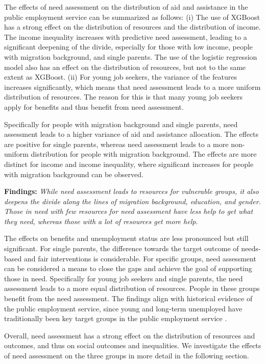 \documentclass{article} %
\begin{document}
The effects of need assessment on the distribution of aid and assistance in the public employment service can be summarized as follows: (i) The use of XGBoost has a strong effect on the distribution of resources and the distribution of income. The income inequality increases with predictive need assessment, leading to a significant deepening of the divide, especially for those with low income, people with migration background, and single parents. The use of the logistic regression model also has an effect on the distribution of resources, but not to the same extent as XGBoost. (ii) For young job seekers, the variance of the features increases significantly, which means that need assessment leads to a more uniform distribution of resources. The reason for this is that many young job seekers apply for benefits and thus benefit from need assessment.

Specifically for people with migration background and single parents, need assessment leads to a higher variance of aid and assistance allocation. The effects are positive for single parents, whereas need assessment leads to a more non-uniform distribution for people with migration background. The effects are more distinct for income and income inequality, where significant increases for people with migration background can be observed.

\textbf{Findings:} \emph{While need assessment leads to resources for vulnerable groups, it also deepens the divide along the lines of migration background, education, and gender. Those in need with few resources for need assessment have less help to get what they need, whereas those with a lot of resources get more help.}

The effects on benefits and unemployment status are less pronounced but still significant. For single parents, the difference towards the target outcome of needs-based and fair interventions is considerable. For specific groups, need assessment can be considered a means to close the gaps and achieve the goal of supporting those in need. Specifically for young job seekers and single parents, the need assessment leads to a more equal distribution of resources. People in these groups benefit from the need assessment. The findings align with historical evidence of the public employment service, since young and long-term unemployed have traditionally been key target groups in the public employment service \citep{Kallus03042021, wirtz2019artificial}.

Overall, need assessment has a strong effect on the distribution of resources and outcomes, and thus on social outcomes and inequalities. We investigate the effects of need assessment on the three groups in more detail in the following section.
\end{document}
